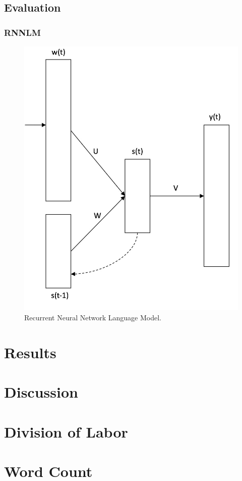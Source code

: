 \documentclass{article}
\begin{document}
\subsection{Evaluation}

\subsubsection{RNNLM}

\begin{figure}[htb]
\centering
\includegraphics[scale=0.2]{RNNLM.png}
\caption{Recurrent Neural Network Language Model.}
\label{fig:rnnlm}
\end{figure}

\section{Results}


\section{Discussion}






\section{Division of Labor}


\section{Word Count}
\end{document}
